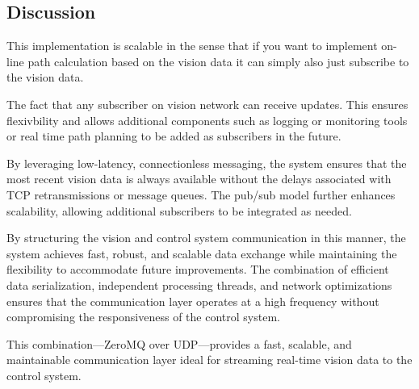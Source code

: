 \subsection{Discussion}
This implementation is scalable in the sense that if you want to implement on-line path calculation based on the vision data it can simply also just subscribe to the vision data.

The fact that any subscriber on vision network can receive updates. This ensures flexivbility and allows additional components such as logging or monitoring tools or real time path planning to be added as subscribers in the future.

By leveraging low-latency, connectionless messaging, the system ensures that the most recent vision data is always available without the delays associated with TCP retransmissions or message queues. The pub/sub model further enhances scalability, allowing additional subscribers to be integrated as needed.

By structuring the vision and control system communication in this manner, the system achieves fast, robust, and scalable data exchange while maintaining the flexibility to accommodate future improvements. The combination of efficient data serialization, independent processing threads, and network optimizations ensures that the communication layer operates at a high frequency without compromising the responsiveness of the control system. 

 This combination—ZeroMQ over UDP—provides a fast, scalable, and maintainable communication layer ideal for streaming real-time vision data to the control system.


